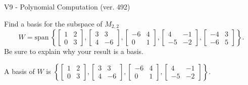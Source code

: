 \begin{exercise}
  \begin{exerciseTitle}V9 - Polynomial Computation (ver. 492)\end{exerciseTitle}
  \begin{exerciseStatement}
    Find a basis for the subspace of \(M_{2,2}\) 
\[W=\mathrm{span}\ \left\{\left[\begin{array}{cc}
1 & 2 \\
0 & 3
\end{array}\right] , \left[\begin{array}{cc}
3 & 3 \\
4 & -6
\end{array}\right] , \left[\begin{array}{cc}
-6 & 4 \\
0 & 1
\end{array}\right] , \left[\begin{array}{cc}
4 & -1 \\
-5 & -2
\end{array}\right] , \left[\begin{array}{cc}
-4 & 3 \\
-6 & 5
\end{array}\right]\right\}.\]
 Be sure to explain why your result is a basis.


  \end{exerciseStatement}
  \begin{exerciseAnswer}
   A basis of \(W\) is  \(\left\{\left[\begin{array}{cc}
1 & 2 \\
0 & 3
\end{array}\right] , \left[\begin{array}{cc}
3 & 3 \\
4 & -6
\end{array}\right] , \left[\begin{array}{cc}
-6 & 4 \\
0 & 1
\end{array}\right] , \left[\begin{array}{cc}
4 & -1 \\
-5 & -2
\end{array}\right]\right\}\).
  


  \end{exerciseAnswer}
\end{exercise}